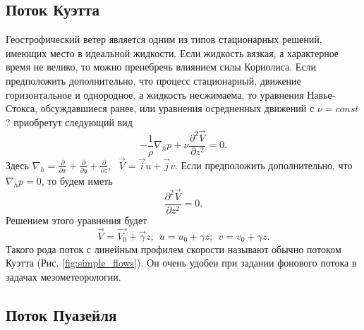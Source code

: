 \subsection{{\color{done}Поток Куэтта}}
    Геострофический ветер является одним из типов стационарных решений, имеющих место в идеальной жидкости. Если жидкость вязкая, а характерное время не велико, то можно пренебречь влиянием силы Кориолиса. Если предположить дополнительно, что процесс стационарный, движение горизонтальное и однородное, а жидкость несжимаема, то уравнения Навье-Стокса, обсуждавшиеся ранее, или уравнения осредненных движений с $\nu=const$? приобретут следующий вид
    \begin{equation}
        -\frac{1}{\rho}\nabla_h p + \nu\frac{\partial^2 \vec{V}}{\partial z^2}=0.  
    \end{equation} 
    Здесь $\nabla_h=\frac{\partial}{\partial x }+\frac{\partial}{\partial y }+\frac{\partial}{\partial z }$, $\:\:\vec{V}=\vec{i}u+\vec{j}v$.
    Если предположить дополнительно, что $\nabla_h p = 0$, то будем иметь
    \begin{equation}
        \frac{\partial^2 \vec{V}}{\partial z^2}=0.  
    \end{equation} 
    Решением этого уравнения будет 
    \begin{equation}
        \vec{V}=\vec{V_0}+\vec{\gamma}z; \:\: u=u_0+  \gamma z; \:\: v=v_0+  \gamma z.
    \end{equation} 
    Такого рода поток с линейным профилем скорости называют обычно потоком Куэтта (Рис. \ref{fig:simple_flows}). Он очень удобен при задании фонового потока в задачах мезометеорологии.

\subsection{{\color{done}Поток Пуазейля}}
    
